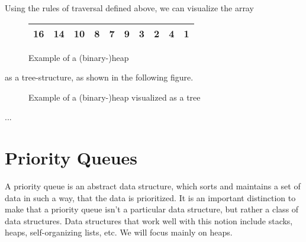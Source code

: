\newpage
\noindent Using the rules of traversal defined above, we can visualize the
array
\begin{figure}[H]
	\center
	\begin{tabular}{|c|c|c|c|c|c|c|c|c|c|}
		\hline 16 & 14 & 10 & 8 & 7 & 9 & 3 & 2 & 4 & 1 \\ \hline
	\end{tabular}
	\caption{Example of a (binary-)heap}
	\label{fig:heap-array}
\end{figure}
as a tree-structure, as shown in the following figure.
\begin{figure}[H]
	\center
	\caption{Example of a (binary-)heap visualized as a tree}
	\label{fig:heap-tree}
\end{figure}
...

\section{Priority Queues}
\label{ch:heaps|sub:priorityqueues}
A priority queue is an abstract data structure, which sorts and maintains a
set of data in such a way, that the data is prioritized. It is an important
distinction to make that a priority queue isn't a particular data structure,
but rather a class of data structures. Data structures that work well with
this notion include stacks, heaps, self-organizing lists, etc. We will focus
mainly on heaps.

